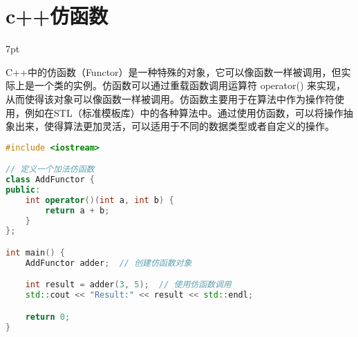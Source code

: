 \documentclass[a4paper,UTF8]{ctexart}
\newenvironment{formal}{%
\def\FrameCommand{%
\hspace{1pt}%
{\color{DarkBlue}\vrule width 2pt}%
{\color{formalshade}\vrule width 4pt}%
\colorbox{formalshade}%
}%
\MakeFramed{\advance\hsize-\width\FrameRestore}%
\noindent\hspace{-4.55pt}%
\begin{adjustwidth}{}{7pt}%
\vspace{2pt}\vspace{2pt}%
}
{%
\vspace{2pt}\end{adjustwidth}\endMakeFramed%
}
\begin{document}
\section{c++仿函数}
\begin{formal}
C++中的仿函数（Functor）是一种特殊的对象，它可以像函数一样被调用，但实际上是一个类的实例。仿函数可以通过重载函数调用运算符 operator() 来实现，从而使得该对象可以像函数一样被调用。仿函数主要用于在算法中作为操作符使用，例如在STL（标准模板库）中的各种算法中。通过使用仿函数，可以将操作抽象出来，使得算法更加灵活，可以适用于不同的数据类型或者自定义的操作。
\end{formal}
\begin{lstlisting}[language=C++, caption=My C++ Code, label=lst:cpp]
#include <iostream>

// 定义一个加法仿函数
class AddFunctor {
public:
    int operator()(int a, int b) {
        return a + b;
    }
};

int main() {
    AddFunctor adder;  // 创建仿函数对象

    int result = adder(3, 5);  // 使用仿函数调用
    std::cout << "Result:" << result << std::endl;

    return 0;
}

\end{lstlisting}
\end{document}
